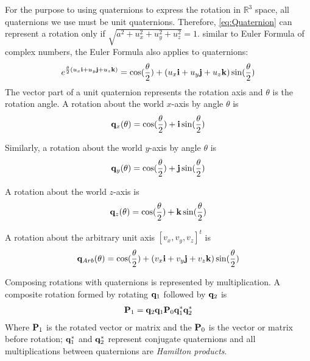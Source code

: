 \documentclass[letter paper, 10pt, conference]{ieeeconf}
\newcommand{\todo}[1]{\vspace{5 mm}\par \noindent \framebox{\begin{minipage}[c]{0.98 \columnwidth} \ttfamily\flushleft \textcolor{red}{#1}\end{minipage}}\vspace{5 mm}\par}
\providecommand{\field}[1]{\mathbb{#1}}
\providecommand{\R}{\field{R}}
\begin{document}
For the purpose to using quaternions to express the rotation in $\R^3$ space, all quaternions we use must be unit quaternions. Therefore, \eqref{eq:Quaternion} can represent a rotation only if $\sqrt{a^2+u_x^2+u_y^2+u_z^2}=1$.
similar to Euler Formula of complex numbers, the Euler Formula also applies to quaternions:
\begin{align}
e^{\frac{\theta}{2} (u_x{\bf i}+u_y{\bf j}+u_z{\bf k})}=\cos(\frac{\theta}{2})+(u_x{\bf i}+u_y{\bf j}+u_z{\bf k})\sin(\frac{\theta}{2})\label{eq:quaternionsEuler}
\end{align}
The vector part of a unit quaternion represents the rotation axis and $\theta$ is the rotation angle.
A rotation about the world $x$-axis by angle $\theta$ is
\begin{align}
 {\bf q}_x(\theta) = \cos( \frac{\theta}{2})+{\bf i}\sin(\frac{\theta}{2}) \label{eq:QuaternionXaxis}
\end{align}

Similarly, a rotation about the world $y$-axis by angle $\theta$ is
\begin{align}
 {\bf q}_y(\theta) = \cos( \frac{\theta}{2})+{\bf j}\sin(\frac{\theta}{2}) \label{eq:QuaternionYaxis}
\end{align}

A rotation about the world $z$-axis is
\begin{align}
{\bf q}_z(\theta) = \cos( \frac{\theta}{2})+{\bf k}\sin(\frac{\theta}{2}) \label{eq:QuaternionZaxis}
\end{align}

A rotation about the arbitrary unit axis $[v_x,v_y,v_z]^t$ is
\begin{align}
{\bf q}_{Arb}(\theta) = \cos( \frac{\theta}{2})+(v_x{\bf i}+v_y{\bf j}+v_z{\bf k})\sin(\frac{\theta}{2}) \label{eq:QuaternionUnitaxis}
\end{align}

Composing rotations with quaternions is represented by multiplication.  A composite rotation formed by rotating ${\bf q}_1$ followed by  ${\bf q}_2$  is 
\begin{align}
{\bf P}_1={\bf q}_2{\bf q}_1{\bf P}_0{\bf q}_1^*{\bf q}_2^*
\end{align}
Where ${\bf P}_1$ is the rotated vector or matrix and the ${\bf P}_0$ is the vector or matrix before rotation; ${\bf q}_1^*$ and ${\bf q}_2^*$ represent conjugate quaternions and all multiplications between quaternions are \emph{Hamilton products}. 
\todo{we have to explain what a Hamilton product is}
\end{document}
